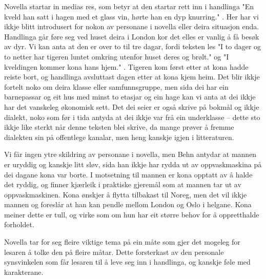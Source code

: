 \documentclass[12pt, a4paper, oneside, openany]{article}
\begin{document}
Novella startar in medias res, som betyr at den startar rett inn i handlinga "En kveld han satt i hagen med et glass vin, hørte han en dyp knurring." \parencite{behn15}. Her har vi ikkje blitt introdusert for nokon av personane i novella eller deira situasjon enda. Handlinga går føre seg ved huset deira i London kor det elles er vanlig å få besøk av dyr. Vi kan anta at den er over to til tre dagar, fordi teksten les "I to dager og to netter har tigeren luntet omkring utenfor huset deres og brølt." \parencite{behn15} og "I kveldingen kommer kona hans hjem." \parencite{behn15}. Tigeren kom først etter at kona hadde reiste bort, og handlinga avsluttast dagen etter at kona kjem heim. Det blir ikkje fortelt noko om deira klasse eller samfunnsgruppe, men sida dei har ein barnepassar og eit hus med minst to etasjar og ein hage kan vi anta at dei ikkje har det vanskeleg økonomisk sett. Det dei seier er også skrive på bokmål og ikkje dialekt, noko som før i tida antyda at dei ikkje var frå ein underklasse – dette sto ikkje like sterkt når denne teksten blei skrive, da mange prøver å fremme dialekten sin på offentlege kanalar, men heng kanskje igjen i litteraturen.

Vi får ingen ytre skildring av personane i novella, men Behn antydar at mannen er uryddig og kanskje litt sløv, sida han ikkje har rydda ut av oppvaskmaskina på dei dagane kona var borte. I motsetning til mannen er kona opptatt av å halde det ryddig, og finner kjærleik i praktiske gjeremål som at mannen tar ut av oppvaskmaskinen. Kona ønskjer å flytta tilbakast til Noreg, men det vil ikkje mannen og foreslår at han kan pendle mellom London og Oslo i helgane. Kona meiner dette er tull, og virke som om hun har eit større behov for å oppretthalde forholdet.

Novella tar for seg fleire viktige tema på ein måte som gjer det mogeleg for lesaren å tolke den på fleire måtar. Dette forsterkast av den personale synsvinkelen som får lesaren til å leve seg inn i handlinga, og kanskje føle med karakterane.

\end{document}
